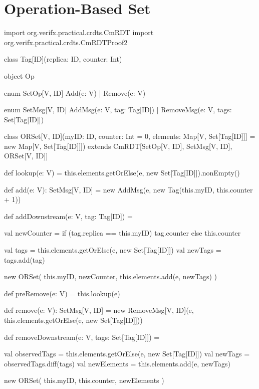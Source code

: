 
%


\chapter{Operation-Based Set}
\label{app:operation_based_set}

\begin{Scala}
import org.verifx.practical.crdts.CmRDT
import org.verifx.practical.crdts.CmRDTProof2

class Tag[ID](replica: ID, counter: Int)

object Op {
  enum SetOp[V, ID] {
    Add(e: V) | Remove(e: V)
  }

  enum SetMsg[V, ID] {
    AddMsg(e: V, tag: Tag[ID]) | RemoveMsg(e: V, tags: Set[Tag[ID]])
  }
}

class ORSet[V, ID](myID: ID, counter: Int = 0,
                   elements: Map[V, Set[Tag[ID]]] = new Map[V, Set[Tag[ID]]]) extends CmRDT[SetOp[V, ID], SetMsg[V, ID], ORSet[V, ID]] {

  def lookup(e: V) =
    this.elements.getOrElse(e, new Set[Tag[ID]]).nonEmpty()

  def add(e: V): SetMsg[V, ID] =
    new AddMsg(e, new Tag(this.myID, this.counter + 1))

  def addDownstream(e: V, tag: Tag[ID]) = {
    val newCounter = if (tag.replica == this.myID) tag.counter else this.counter

    val tags = this.elements.getOrElse(e, new Set[Tag[ID]])
    val newTags = tags.add(tag)

    new ORSet(
      this.myID,
      newCounter,
      this.elements.add(e, newTags)
    )
  }

  def preRemove(e: V) = this.lookup(e)

  def remove(e: V): SetMsg[V, ID] =
    new RemoveMsg[V, ID](e, this.elements.getOrElse(e, new Set[Tag[ID]]))

  def removeDownstream(e: V, tags: Set[Tag[ID]]) = {
    val observedTags = this.elements.getOrElse(e, new Set[Tag[ID]])
    val newTags = observedTags.diff(tags)
    val newElements = this.elements.add(e, newTags)

    new ORSet(
      this.myID,
      this.counter,
      newElements
    )
  }

}
\end{Scala}
